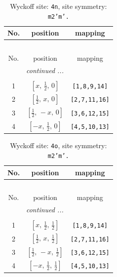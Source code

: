 \documentclass[fleqn,8pt]{jsarticle}
\begin{document}
\renewcommand{\arraystretch}{1.2}
\begin{longtable}{ccc}
\caption{Wyckoff site: {\tt 4n}, site symmetry: {\tt m2'm'.}}
 \\
 \hline \hline
No. & position & mapping \\ \hline \endfirsthead

\multicolumn{2}{l}{\tablename\ \thetable{}} \\
 \hline \hline
No. & position & mapping \\ \hline \endhead

 \hline \hline
\multicolumn{2}{r}{\footnotesize\it continued ...} \\ \endfoot

 \hline \hline
\multicolumn{2}{r}{} \\ \endlastfoot

1 & $\left[ x,\, \frac{1}{2},\, 0 \right]$ & {\tt [1,8,9,14]} \\ \hline
2 & $\left[ \frac{1}{2},\, x,\, 0 \right]$ & {\tt [2,7,11,16]} \\ \hline
3 & $\left[ \frac{1}{2},\, - x,\, 0 \right]$ & {\tt [3,6,12,15]} \\ \hline
4 & $\left[ - x,\, \frac{1}{2},\, 0 \right]$ & {\tt [4,5,10,13]} \\
\end{longtable}
\renewcommand{\arraystretch}{1.2}
\begin{longtable}{ccc}
\caption{Wyckoff site: {\tt 4o}, site symmetry: {\tt m2'm'.}}
 \\
 \hline \hline
No. & position & mapping \\ \hline \endfirsthead

\multicolumn{2}{l}{\tablename\ \thetable{}} \\
 \hline \hline
No. & position & mapping \\ \hline \endhead

 \hline \hline
\multicolumn{2}{r}{\footnotesize\it continued ...} \\ \endfoot

 \hline \hline
\multicolumn{2}{r}{} \\ \endlastfoot

1 & $\left[ x,\, \frac{1}{2},\, \frac{1}{2} \right]$ & {\tt [1,8,9,14]} \\ \hline
2 & $\left[ \frac{1}{2},\, x,\, \frac{1}{2} \right]$ & {\tt [2,7,11,16]} \\ \hline
3 & $\left[ \frac{1}{2},\, - x,\, \frac{1}{2} \right]$ & {\tt [3,6,12,15]} \\ \hline
4 & $\left[ - x,\, \frac{1}{2},\, \frac{1}{2} \right]$ & {\tt [4,5,10,13]} \\
\end{longtable}
\end{document}
